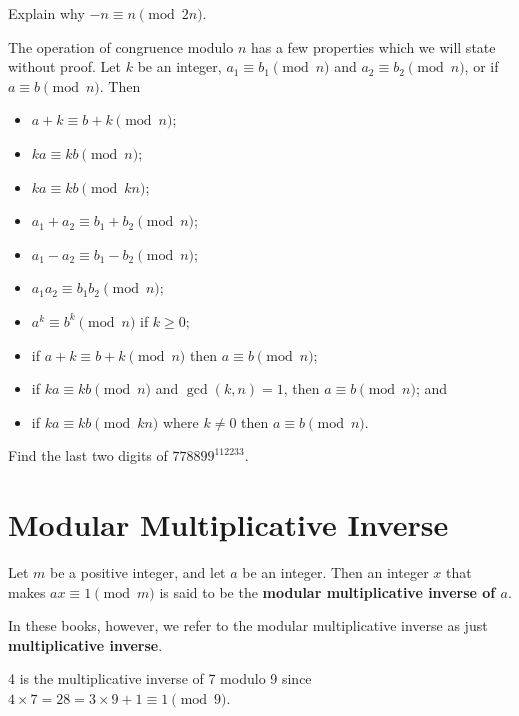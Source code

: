 \begin{exercise}
    Explain why $-n \equiv n \pmod{2n}$.
\end{exercise}

The operation of congruence modulo $n$ has a few properties which we will state without proof. Let $k$ be an integer, $a_1 \equiv b_1 \pmod n$ and $a_2 \equiv b_2 \pmod n$, or if $a \equiv b \pmod n$. Then
\begin{itemize}
    \item $a + k \equiv b + k \pmod n$;
    \item $ka \equiv kb \pmod n$;
    \item $ka \equiv kb \pmod {kn}$;
    \item $a_1 + a_2 \equiv b_1 + b_2 \pmod n$;
    \item $a_1 - a_2 \equiv b_1 - b_2 \pmod n$;
    \item $a_1a_2 \equiv b_1b_2 \pmod n$;
    \item $a^k \equiv b^k \pmod n$ if $k \geq 0$;
    \item if $a+k \equiv b+k \pmod n$ then $a \equiv b \pmod n$;
    \item if $ka \equiv kb \pmod n$ and $\gcd(k, n) = 1$, then $a \equiv b \pmod n$; and
    \item if $ka \equiv kb \pmod{kn}$ where $k \neq 0$ then $a \equiv b \pmod n$.
\end{itemize}

\begin{exercise}
    Find the last two digits of $778899^{112233}$.
\end{exercise}

\section{Modular Multiplicative Inverse}
\begin{definition}
    Let $m$ be a positive integer, and let $a$ be an integer. Then an integer $x$ that makes $ax \equiv 1 \pmod m$ is said to be the \textbf{modular multiplicative inverse of $a$}.
\end{definition}
\begin{remark}
    In these books, however, we refer to the modular multiplicative inverse as just \textbf{multiplicative inverse}.
\end{remark}
\begin{example}
    4 is the multiplicative inverse of 7 modulo 9 since $4 \times 7 = 28 = 3 \times 9 + 1 \equiv 1 \pmod 9$.
\end{example}

